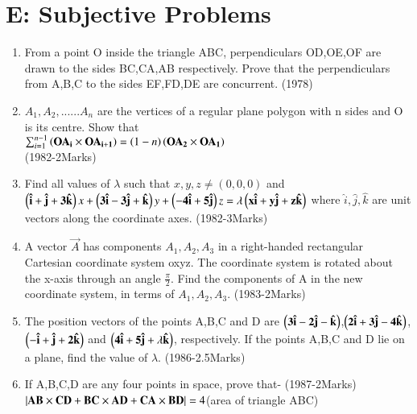 \documentclass[journal,12pt,twocolumn]{IEEEtran}
\theoremstyle{remark}
\begin{document}
\section{E: Subjective Problems}
\begin{enumerate}
\item From a point O inside the triangle ABC, perpendiculars OD,OE,OF are drawn to the sides BC,CA,AB respectively. Prove that the perpendiculars from A,B,C to the sides EF,FD,DE are concurrent. \hfill{(1978)}\\

\item $A_1,A_2,......A_n$ are the vertices of a regular plane polygon with n sides and O is its centre. Show that\\
	$\sum_{i=1}^{n-1}\left(\mathbf{OA_i}\times\mathbf{OA_{i+1}}\right)= \left(1-n\right)\left(\mathbf{OA_2}\times\mathbf{OA_1}\right)$\\
		\hfill{(1982-2Marks)}\\

	\item Find all values of $\lambda$ such that $x,y,z\neq(0,0,0)$ and $\left(\mathbf{\hat{i}+\hat{j}+3\hat{k}}\right)x+\left(\mathbf{3\hat{i}-3\hat{j}+\hat{k}}\right)y+\left(\mathbf{-4\hat{i}+5\hat{j}}\right)z=\lambda\left(\mathbf{x\hat{i}+y\hat{j}+z\hat{k}}\right)$ where $\hat{i},\hat{j},\hat{k}$ are unit vectors along the coordinate axes. \hfill{(1982-3Marks)}\\

\item A vector $\vec{A}$ has components $A_1,A_2,A_3$ in a right-handed rectangular Cartesian coordinate system oxyz. The coordinate system is rotated about the x-axis through an angle $\frac{\pi}{2}$. Find the components of A in the new coordinate system, in terms of $A_1,A_2,A_3$. \hfill{(1983-2Marks)}\\

\item The position vectors of the points A,B,C and D are $\mathbf{\left(3\hat{i}-2\hat{j}-\hat{k}\right)}$,$\mathbf{\left(2\hat{i}+3\hat{j}-4\hat{k}\right)}$,$\mathbf{\left(-\hat{i}+\hat{j}+2\hat{k}\right)}$ and $\mathbf{\left(4\hat{i}+5\hat{j}+\lambda\hat{k}\right)}$, respectively. If the points A,B,C and D lie on a plane, find the value of $\lambda$. \hfill{(1986-2.5Marks)}\\

\item If A,B,C,D are any four points in space, prove that- \hfill{(1987-2Marks)}\\
	$\left\vert\mathbf{AB}\times\mathbf{CD}+\mathbf{BC}\times\mathbf{AD}+\mathbf{CA}\times\mathbf{BD}\right\vert=4$(area of triangle ABC)\\


\end{enumerate}
\end{document}
